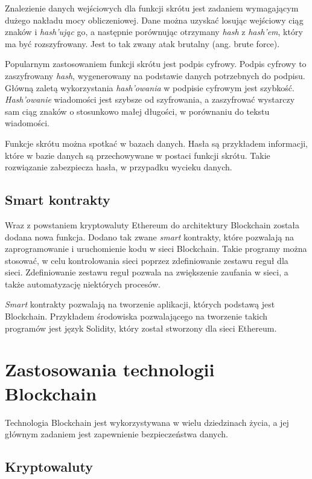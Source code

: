\documentclass[a4paper,12pt]{book}
\begin{document}
Znalezienie danych wejściowych dla funkcji skrótu jest zadaniem wymagającym dużego nakładu mocy obliczeniowej. Dane można uzyskać losując wejściowy ciąg znaków i \textit{hash'ując} go, a następnie porównując otrzymany \textit{hash} z \textit{hash'em}, który ma być rozszyfrowany. Jest to tak zwany atak brutalny (ang. brute force).

Popularnym zastosowaniem funkcji skrótu jest podpis cyfrowy. Podpis cyfrowy to zaszyfrowany \textit{hash}, wygenerowany na podstawie danych potrzebnych do podpisu. Główną zaletą wykorzystania \textit{hash'owania} w podpisie cyfrowym jest szybkość. \textit{Hash'owanie} wiadomości jest szybsze od szyfrowania, a zaszyfrować wystarczy sam ciąg znaków o stosunkowo małej długości, w porównaniu do tekstu wiadomości.

Funkcje skrótu można spotkać w bazach danych. Hasła są przykładem informacji, które w bazie danych są przechowywane w postaci funkcji skrótu. Takie rozwiązanie zabezpiecza hasła, w przypadku wycieku danych. \cite{hash}

\subsection{Smart kontrakty}

Wraz z powstaniem kryptowaluty Ethereum do architektury Blockchain została dodana nowa funkcja. Dodano tak zwane \textit{smart} kontrakty, które pozwalają na zaprogramowanie i uruchomienie kodu w sieci Blockchain. Takie programy można stosować, w celu kontrolowania sieci poprzez zdefiniowanie zestawu reguł dla sieci. Zdefiniowanie zestawu reguł pozwala na zwiększenie zaufania w sieci, a także automatyzację niektórych procesów.

\textit{Smart} kontrakty pozwalają na tworzenie aplikacji, których podstawą jest Blockchain. Przykładem środowiska pozwalającego na tworzenie takich programów jest język Solidity, który został stworzony dla sieci Ethereum\cite{smart-contract}. 

\section{Zastosowania technologii Blockchain}

Technologia Blockchain jest wykorzystywana w wielu dziedzinach życia, a jej głównym zadaniem jest zapewnienie bezpieczeństwa danych. 

\subsection{Kryptowaluty}
\end{document}
